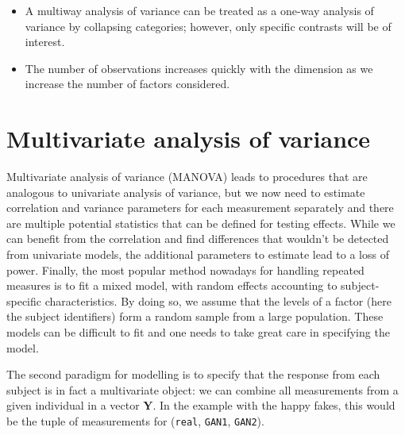 \documentclass[
  11pt,
  letterpaper,
]{scrbook}
\providecommand{\tightlist}{%
  \setlength{\itemsep}{0pt}\setlength{\parskip}{0pt}}\usepackage{longtable,booktabs,array}
\theoremstyle{definition}
\theoremstyle{definition}
\theoremstyle{remark}
\begin{document}
\begin{tcolorbox}[enhanced jigsaw, bottomrule=.15mm, coltitle=black, colframe=quarto-callout-important-color-frame, left=2mm, opacityback=0, breakable, opacitybacktitle=0.6, rightrule=.15mm, toprule=.15mm, title=\textcolor{quarto-callout-important-color}{\faExclamation}\hspace{0.5em}{\textbf{Summary}}, toptitle=1mm, leftrule=.75mm, titlerule=0mm, colback=white, arc=.35mm, bottomtitle=1mm, colbacktitle=quarto-callout-important-color!10!white]

\begin{itemize}
\tightlist
\item
  A multiway analysis of variance can be treated as a one-way analysis
  of variance by collapsing categories; however, only specific contrasts
  will be of interest.
\item
  The number of observations increases quickly with the dimension as we
  increase the number of factors considered.
\end{itemize}

\end{tcolorbox}


\chapter{Multivariate analysis of
variance}\label{multivariate-analysis-of-variance}

Multivariate analysis of variance (MANOVA) leads to procedures that are
analogous to univariate analysis of variance, but we now need to
estimate correlation and variance parameters for each measurement
separately and there are multiple potential statistics that can be
defined for testing effects. While we can benefit from the correlation
and find differences that wouldn't be detected from univariate models,
the additional parameters to estimate lead to a loss of power. Finally,
the most popular method nowadays for handling repeated measures is to
fit a mixed model, with random effects accounting to subject-specific
characteristics. By doing so, we assume that the levels of a factor
(here the subject identifiers) form a random sample from a large
population. These models can be difficult to fit and one needs to take
great care in specifying the model.

The second paradigm for modelling is to specify that the response from
each subject is in fact a multivariate object: we can combine all
measurements from a given individual in a vector \(\boldsymbol{Y}\). In
the example with the happy fakes, this would be the tuple of
measurements for (\texttt{real}, \texttt{GAN1}, \texttt{GAN2}).
\end{document}
